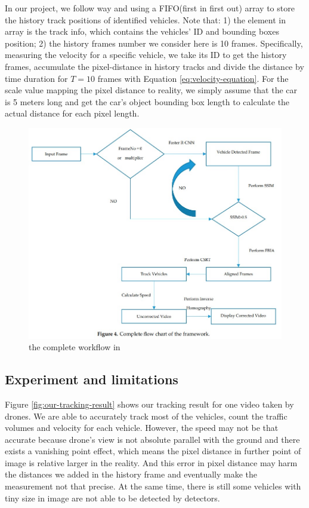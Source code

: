 \documentclass[10pt,twocolumn,letterpaper]{article}  %
\begin{document}
In our project, we follow \cite{biswas2019speed} way and using a FIFO(first in first out) array to store the history track positions of identified vehicles. Note that: 1) the element in array is the track info, which contains the vehicles' ID and  bounding boxes position; 2) the history frames number we consider here is 10 frames. Specifically, measuring the velocity for a specific vehicle, we take its ID to get the history frames, accumulate the pixel-distance in history tracks and divide the distance by time duration for $T=10$ frames with Equation \ref{eq:velocity-equation}. For the scale value mapping the pixel distance to reality, we simply assume that the car is 5 meters long and get the car's object bounding box length to calculate the actual distance for each pixel length.


\begin{figure}[!t]
	\centering
	\includegraphics[width=0.95\linewidth]{./figures/biswas2019speed_complete_framework.jpg} %
	\caption{the complete workflow in \cite{biswas2019speed}}
	\label{fig:biswas2019speed_complete_framework}
\end{figure}


\subsection{Experiment and limitations}
Figure \ref{fig:our-tracking-result} shows our tracking result for one video taken by drones. We are able to accurately track most of the vehicles, count the traffic volumes and velocity for each vehicle. However, the speed may not be that accurate because drone's view is not absolute parallel with the ground and there exists a vanishing point effect, which means the pixel distance in further point of image is relative larger in the reality. And this error in pixel distance may harm the distances we added in the history frame and eventually make the measurement not that precise. At the same time, there is still some vehicles with tiny size in image are not able to be detected by detectors.
\end{document}
